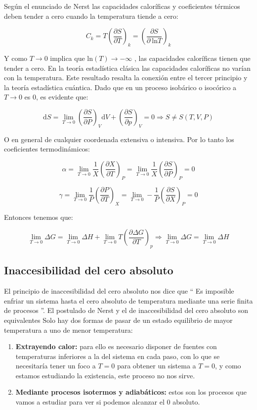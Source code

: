 \documentclass[12pt,a4paper]{article}
\newcommand{\D}{\mathrm{d}}
\newcommand{\Ln}{\mathrm{ln}}
\newcommand{\parentesis}[1]{\left( #1 \right)}
\newcommand{\parcialesnormales}[2]{\parentesis{\parciales{ #1}{#2 }}}
\newcommand{\parciales}[2]{\frac{\partial #1}{\partial #2}}
\begin{document}
Según el enunciado de Nerst las capacidades caloríficas y coeficientes térmicos deben tender a cero cuando la temperatura tiende a cero:

$$ C_k = T \parcialesnormales{S}{T}_k = \parcialesnormales{S}{ \ \Ln T}_k$$ 

Y como $T \rightarrow 0$ implica que $\Ln (T) \rightarrow - \infty$ , las capacidades caloríficas tienen que tender a cero. En la teoría estadística clásica las capacidades caloríficas no varían con la temperatura. Este resultado resalta la conexión entre el tercer principio y la teoría estadística cuántica. Dado que en un proceso isobárico o isocórico a $T \rightarrow 0$ es 0, es evidente que:

$$ \D S = \lim_{T \rightarrow 0} \parcialesnormales{S}{P}_V \D V + \parcialesnormales{S}{p}_V  = 0  \Longrightarrow S \neq S(T,V,P) $$


O en general de cualquier coordenada extensiva o intensiva. Por lo tanto los coeficientes termodinámicos:

 $$ \alpha =  \lim_{T \rightarrow 0} \dfrac{1}{X} \parcialesnormales{X}{T}_P = \lim_{T \rightarrow 0} \dfrac{1}{X} \parcialesnormales{S}{P}_P = 0 $$
 
$$ \gamma = \lim_{T \rightarrow 0} \dfrac{1}{P} \parcialesnormales{P}{T}_X = \lim_{T \rightarrow 0} - \dfrac{1}{P} \parcialesnormales{S}{X}_P = 0 $$

Entonces tenemos que: 

$$  \lim_{T \rightarrow 0} \Delta G =  \lim_{T \rightarrow 0} \Delta H +  \lim_{T \rightarrow 0} T \parcialesnormales{\Delta G}{T}_p \Longrightarrow  \lim_{T \rightarrow 0} \Delta G =  \lim_{T \rightarrow 0} \Delta H  $$

\subsection{Inaccesibilidad del cero absoluto}

El principio de inaccesibilidad del cero absoluto nos dice que `` Es imposible enfriar un sistema hasta el cero absoluto de temperatura mediante una serie finita de procesos ''. El postulado de Nerst y el de inaccesibilidad del cero absoluto son equivalentes Solo hay dos formas de pasar de un estado equilibrio de mayor temperatura a uno de menor temperatura: 

\begin{enumerate}
\item \textbf{Extrayendo calor:} para ello es necesario disponer de fuentes con temperaturas inferiores a la del sistema en cada paso, con lo que se necesitaría tener un foco a $T=0$ para obtener un sistema a $T=0$, y como estamos estudiando la existencia, este proceso no nos sirve.

\item \textbf{Mediante procesos isotermos y adiabáticos:} estos son los procesos que vamos a estudiar para ver si podemos alcanzar el 0 absoluto.
\end{enumerate}
\end{document}
